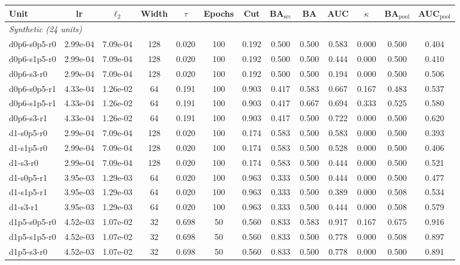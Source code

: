 \begin{tabular}{lcccccccccccc}
\toprule
Unit & lr & $\ell_2$ & Width & $\tau$ & Epochs & Cut & BA$_{\mathrm{src}}$ & BA & AUC & $\kappa$ & BA$_{\mathrm{pool}}$ & AUC$_{\mathrm{pool}}$ \\
\midrule
\multicolumn{13}{l}{\textit{Synthetic (24 units)}} \\
d0p6-s0p5-r0 & 2.99e-04 & 7.09e-04 & 128 & 0.020 & 100 & 0.192 & 0.500 & 0.500 & 0.583 & 0.000 & 0.500 & 0.404 \\
d0p6-s1p5-r0 & 2.99e-04 & 7.09e-04 & 128 & 0.020 & 100 & 0.192 & 0.500 & 0.500 & 0.444 & 0.000 & 0.500 & 0.410 \\
d0p6-s3-r0 & 2.99e-04 & 7.09e-04 & 128 & 0.020 & 100 & 0.192 & 0.500 & 0.500 & 0.194 & 0.000 & 0.500 & 0.506 \\
d0p6-s0p5-r1 & 4.33e-04 & 1.26e-02 & 64 & 0.191 & 100 & 0.903 & 0.417 & 0.583 & 0.667 & 0.167 & 0.483 & 0.537 \\
d0p6-s1p5-r1 & 4.33e-04 & 1.26e-02 & 64 & 0.191 & 100 & 0.903 & 0.417 & 0.667 & 0.694 & 0.333 & 0.525 & 0.580 \\
d0p6-s3-r1 & 4.33e-04 & 1.26e-02 & 64 & 0.191 & 100 & 0.903 & 0.417 & 0.500 & 0.722 & 0.000 & 0.500 & 0.620 \\
d1-s0p5-r0 & 2.99e-04 & 7.09e-04 & 128 & 0.020 & 100 & 0.174 & 0.583 & 0.500 & 0.583 & 0.000 & 0.500 & 0.393 \\
d1-s1p5-r0 & 2.99e-04 & 7.09e-04 & 128 & 0.020 & 100 & 0.174 & 0.583 & 0.500 & 0.528 & 0.000 & 0.500 & 0.406 \\
d1-s3-r0 & 2.99e-04 & 7.09e-04 & 128 & 0.020 & 100 & 0.174 & 0.583 & 0.500 & 0.444 & 0.000 & 0.500 & 0.521 \\
d1-s0p5-r1 & 3.95e-03 & 1.29e-03 & 64 & 0.020 & 100 & 0.963 & 0.333 & 0.500 & 0.444 & 0.000 & 0.500 & 0.477 \\
d1-s1p5-r1 & 3.95e-03 & 1.29e-03 & 64 & 0.020 & 100 & 0.963 & 0.333 & 0.500 & 0.389 & 0.000 & 0.508 & 0.534 \\
d1-s3-r1 & 3.95e-03 & 1.29e-03 & 64 & 0.020 & 100 & 0.963 & 0.333 & 0.500 & 0.444 & 0.000 & 0.508 & 0.579 \\
d1p5-s0p5-r0 & 4.52e-03 & 1.07e-02 & 32 & 0.698 & 50 & 0.560 & 0.833 & 0.583 & 0.917 & 0.167 & 0.675 & 0.916 \\
d1p5-s1p5-r0 & 4.52e-03 & 1.07e-02 & 32 & 0.698 & 50 & 0.560 & 0.833 & 0.500 & 0.778 & 0.000 & 0.508 & 0.897 \\
d1p5-s3-r0 & 4.52e-03 & 1.07e-02 & 32 & 0.698 & 50 & 0.560 & 0.833 & 0.500 & 0.778 & 0.000 & 0.500 & 0.891 \\

\end{tabular}

